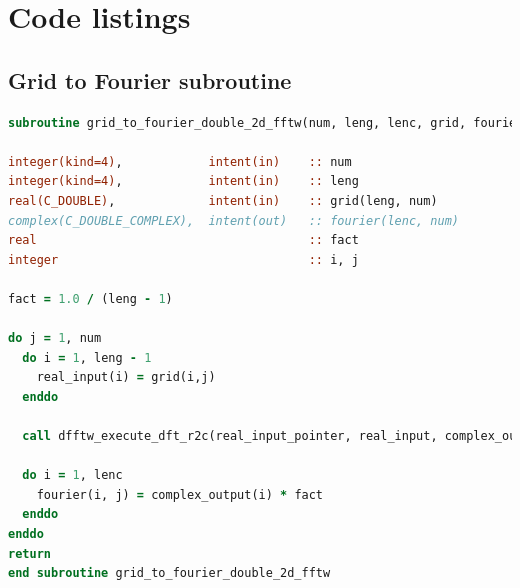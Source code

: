 \documentclass[a4paper,11pt]{report}
\newcommand{\toclesssection}[1]{\section{#1}\addtocounter{section}{1}}
\begin{document}
\chapter{Code listings}
\label{apdx:codelisting}

\toclesssection{Grid to Fourier subroutine}

\begin{lstlisting}[language=Fortran,caption={Code used to perform an FFT using the FFTW library. This subroutine can be found in the new \texttt{fftw.F90} module, and transforms a 2D data structure from the spacial domain to frequency domain.}]
subroutine grid_to_fourier_double_2d_fftw(num, leng, lenc, grid, fourier)

integer(kind=4),            intent(in)    :: num    
integer(kind=4),            intent(in)    :: leng   
real(C_DOUBLE),             intent(in)    :: grid(leng, num)
complex(C_DOUBLE_COMPLEX),  intent(out)   :: fourier(lenc, num)
real                                      :: fact 
integer                                   :: i, j

fact = 1.0 / (leng - 1)

do j = 1, num
  do i = 1, leng - 1
    real_input(i) = grid(i,j)
  enddo

  call dfftw_execute_dft_r2c(real_input_pointer, real_input, complex_output)

  do i = 1, lenc
    fourier(i, j) = complex_output(i) * fact
  enddo
enddo
return
end subroutine grid_to_fourier_double_2d_fftw
\end{lstlisting}
\end{document}

